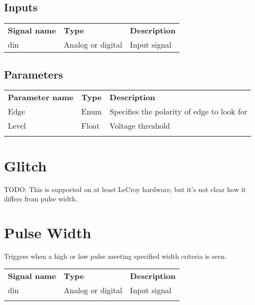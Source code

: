 \subsection{Inputs}

\begin{tabularx}{16cm}{llX}
\thickhline
\textbf{Signal name} & \textbf{Type} & \textbf{Description} \\
\thickhline
din & Analog or digital & Input signal \\
\end{tabularx}

\subsection{Parameters}

\begin{tabularx}{16cm}{llX}
\thickhline
\textbf{Parameter name} & \textbf{Type} & \textbf{Description} \\
\thickhline
Edge & Enum & Specifies the polarity of edge to look for\\
\thinhline
Level & Float & Voltage threshold\\
\thickhline
\end{tabularx}

\section{Glitch}

TODO: This is supported on at least LeCroy hardware, but it's not clear how it differs from pulse width.


\section{Pulse Width}

Triggers when a high or low pulse meeting specified width criteria is seen.

\begin{tabularx}{16cm}{llX}
\thickhline
\textbf{Signal name} & \textbf{Type} & \textbf{Description} \\
\thickhline
din & Analog or digital & Input signal \\
\thickhline
\end{tabularx}

